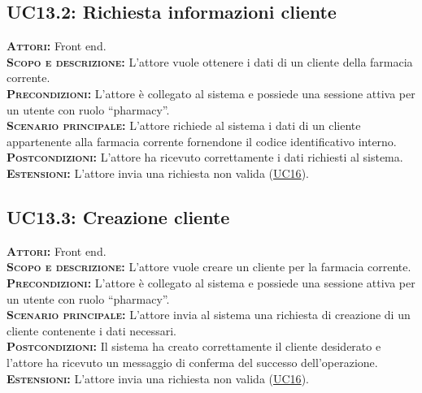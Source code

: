 \subsection{UC13.2: Richiesta informazioni cliente}
\label{sec:UC132}
\textsc{\textbf{Attori:}} Front end.\\
\textsc{\textbf{Scopo e descrizione:}} L'attore vuole ottenere i dati di un cliente della farmacia corrente.\\
\textsc{\textsc{\textbf{Precondizioni:}}} L'attore è collegato al sistema e possiede una sessione attiva per un utente con ruolo ``pharmacy''.\\
\textsc{\textbf{Scenario principale:}} L'attore richiede al sistema i dati di un cliente appartenente alla farmacia corrente fornendone il codice identificativo interno.\\
\textsc{\textbf{Postcondizioni:}} L'attore ha ricevuto correttamente i dati richiesti al sistema.\\
\textsc{\textbf{Estensioni:}} L'attore invia una richiesta non valida (\hyperref[sec:UC16]{UC16}).

\subsection{UC13.3: Creazione cliente}
\label{sec:UC133}
\textsc{\textbf{Attori:}} Front end.\\
\textsc{\textbf{Scopo e descrizione:}} L'attore vuole creare un cliente per la farmacia corrente.\\
\textsc{\textsc{\textbf{Precondizioni:}}} L'attore è collegato al sistema e possiede una sessione attiva per un utente con ruolo ``pharmacy''.\\
\textsc{\textbf{Scenario principale:}} L'attore invia al sistema una richiesta di creazione di un cliente contenente i dati necessari.\\
\textsc{\textbf{Postcondizioni:}} Il sistema ha creato correttamente il cliente desiderato e l'attore ha ricevuto un messaggio di conferma del successo dell'operazione.\\
\textsc{\textbf{Estensioni:}} L'attore invia una richiesta non valida (\hyperref[sec:UC16]{UC16}).

